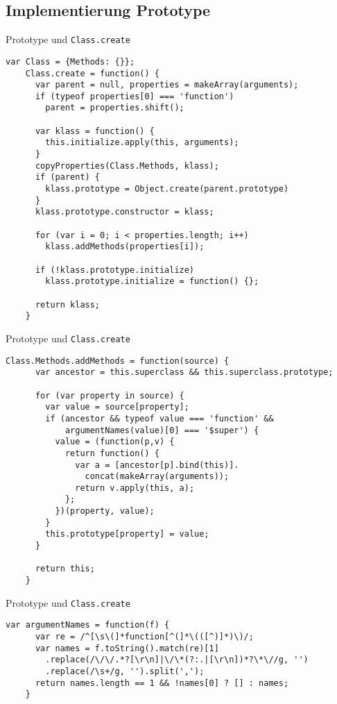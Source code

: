 \subsection{Implementierung Prototype}

\begin{frame}[fragile]{Prototype und \texttt{Class.create}}
  \begin{lstlisting}[gobble=4]
    var Class = {Methods: {}};
    Class.create = function() {
      var parent = null, properties = makeArray(arguments);
      if (typeof properties[0] === 'function')
        parent = properties.shift();
  
      var klass = function() {
        this.initialize.apply(this, arguments);
      }  
      copyProperties(Class.Methods, klass);
      if (parent) {
        klass.prototype = Object.create(parent.prototype)
      }
      klass.prototype.constructor = klass;
  
      for (var i = 0; i < properties.length; i++)
        klass.addMethods(properties[i]);
  
      if (!klass.prototype.initialize)
        klass.prototype.initialize = function() {};
  
      return klass;
    }
  \end{lstlisting}
\end{frame}

\begin{frame}[fragile]{Prototype und \texttt{Class.create}}
  \begin{lstlisting}[gobble=4]
    Class.Methods.addMethods = function(source) {
      var ancestor = this.superclass && this.superclass.prototype;
  
      for (var property in source) {
        var value = source[property];
        if (ancestor && typeof value === 'function' &&
            argumentNames(value)[0] === '$super') {
          value = (function(p,v) {
            return function() {
              var a = [ancestor[p].bind(this)].
                concat(makeArray(arguments));
              return v.apply(this, a);
            };
          })(property, value);
        }
        this.prototype[property] = value;
      }
  
      return this;
    }
  \end{lstlisting}
\end{frame}

\begin{frame}[fragile]{Prototype und \texttt{Class.create}}
  \begin{lstlisting}[gobble=4]
    var argumentNames = function(f) {
      var re = /^[\s\(]*function[^(]*\(([^)]*)\)/;
      var names = f.toString().match(re)[1]
        .replace(/\/\/.*?[\r\n]|\/\*(?:.|[\r\n])*?\*\//g, '')
        .replace(/\s+/g, '').split(',');
      return names.length == 1 && !names[0] ? [] : names;
    }
  \end{lstlisting}
\end{frame}

